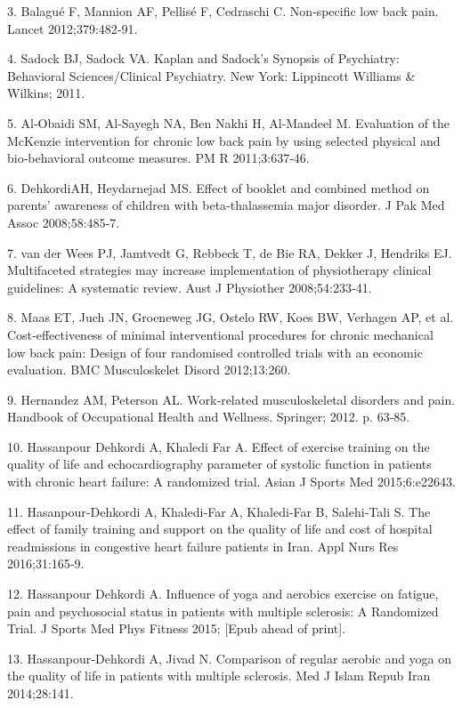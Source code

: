 \documentclass[a5paper]{article}
\theoremstyle{definition}
\begin{document}
3. Balagué F, Mannion AF, Pellisé F, Cedraschi C. Non‑specific low back
pain. Lancet 2012;379:482‑91.

4. Sadock BJ, Sadock VA. Kaplan and Sadock’s Synopsis of Psychiatry:
Behavioral Sciences/Clinical Psychiatry. New York: Lippincott
Williams \& Wilkins; 2011.

5. Al‑Obaidi SM, Al‑Sayegh NA, Ben Nakhi H, Al‑Mandeel M.
Evaluation of the McKenzie intervention for chronic low back pain by
using selected physical and bio‑behavioral outcome measures. PM R
2011;3:637‑46.

6. DehkordiAH, Heydarnejad MS. Effect of booklet and combined method
on parents’ awareness of children with beta‑thalassemia major disorder.
J Pak Med Assoc 2008;58:485‑7.

7. van der Wees PJ, Jamtvedt G, Rebbeck T, de Bie RA, Dekker J,
Hendriks EJ. Multifaceted strategies may increase implementation
of physiotherapy clinical guidelines: A systematic review. Aust J
Physiother 2008;54:233‑41.

8. Maas ET, Juch JN, Groeneweg JG, Ostelo RW, Koes BW, Verhagen AP,
et al. Cost‑effectiveness of minimal interventional procedures for chronic
mechanical low back pain: Design of four randomised controlled trials
with an economic evaluation. BMC Musculoskelet Disord 2012;13:260.

9. Hernandez AM, Peterson AL. Work‑related musculoskeletal disorders
and pain. Handbook of Occupational Health and Wellness. Springer;
2012. p. 63‑85.

10. Hassanpour Dehkordi A, Khaledi Far A. Effect of exercise training on
the quality of life and echocardiography parameter of systolic function
in patients with chronic heart failure: A randomized trial. Asian J Sports
Med 2015;6:e22643.

11. Hasanpour‑Dehkordi A, Khaledi‑Far A, Khaledi‑Far B, Salehi‑Tali S.
The effect of family training and support on the quality of life and cost
of hospital readmissions in congestive heart failure patients in Iran. Appl
Nurs Res 2016;31:165‑9.

12. Hassanpour Dehkordi A. Influence of yoga and aerobics exercise on
fatigue, pain and psychosocial status in patients with multiple sclerosis:
A Randomized Trial. J Sports Med Phys Fitness 2015; [Epub ahead of
print].

13. Hassanpour‑Dehkordi A, Jivad N. Comparison of regular aerobic and
yoga on the quality of life in patients with multiple sclerosis. Med J
Islam Repub Iran 2014;28:141.
\end{document}
